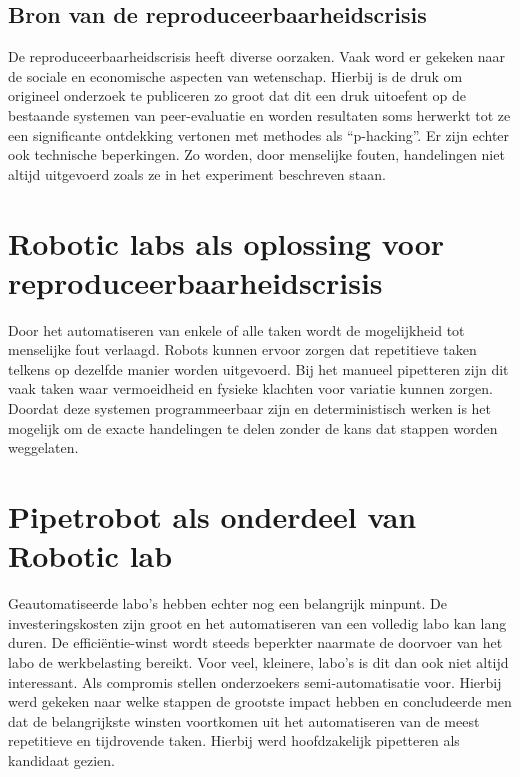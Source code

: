 \subsection{Bron van de reproduceerbaarheidscrisis}
De reproduceerbaarheidscrisis heeft diverse oorzaken. Vaak word er gekeken naar de sociale en economische aspecten van wetenschap.\cite{RN12} Hierbij is de druk om origineel onderzoek te publiceren zo groot dat dit een druk uitoefent op de bestaande systemen van peer-evaluatie en worden resultaten soms herwerkt tot ze een significante ontdekking vertonen met methodes als “p-hacking”.\cite{RN2,RN6} Er zijn echter ook technische beperkingen. Zo worden, door menselijke fouten, handelingen niet altijd uitgevoerd zoals ze in het experiment beschreven staan. 

\section{Robotic labs als oplossing voor reproduceerbaarheidscrisis}
Door het automatiseren van enkele of alle taken wordt de mogelijkheid tot menselijke fout verlaagd. Robots kunnen ervoor zorgen dat repetitieve taken telkens op dezelfde manier worden uitgevoerd. Bij het manueel pipetteren zijn dit vaak taken waar vermoeidheid en fysieke klachten voor variatie kunnen zorgen.\ \cite{RN9} Doordat deze systemen programmeerbaar zijn en deterministisch werken is het mogelijk om de exacte handelingen te delen zonder de kans dat stappen worden weggelaten.
\section{Pipetrobot als onderdeel van Robotic lab}
Geautomatiseerde labo’s hebben echter nog een belangrijk minpunt. De investeringskosten zijn groot en het automatiseren van een volledig labo kan lang duren. De efficiëntie-winst wordt steeds beperkter naarmate de doorvoer van het labo de werkbelasting bereikt. Voor veel, kleinere, labo’s is dit dan ook niet altijd interessant. Als compromis stellen onderzoekers semi-automatisatie voor. Hierbij werd gekeken naar welke stappen de grootste impact hebben en concludeerde men dat de belangrijkste winsten voortkomen uit het automatiseren van de meest repetitieve en tijdrovende taken. Hierbij werd hoofdzakelijk pipetteren als kandidaat gezien.\cite{RN11,RN7}
